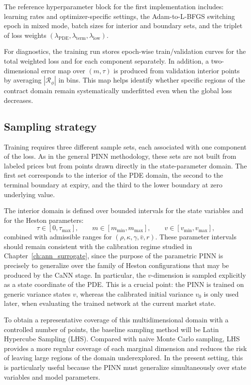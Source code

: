 The reference hyperparameter block for the first implementation includes: learning rates and optimizer-specific settings, the Adam-to-L-BFGS switching epoch in mixed mode, batch sizes for interior and boundary sets, and the triplet of loss weights $(\lambda_{\mathrm{PDE}},\lambda_{\mathrm{term}},\lambda_{\mathrm{low}})$.

For diagnostics, the training run stores epoch-wise train/validation curves for the total weighted loss and for each component separately. In addition, a two-dimensional error map over $(m,\tau)$ is produced from validation interior points by averaging $|\mathcal{R}_\phi|$ in bins. This map helps identify whether specific regions of the contract domain remain systematically underfitted even when the global loss decreases.

\subsection{Sampling strategy}

Training requires three different sample sets, each associated with one component of the loss. As in the general PINN methodology, these sets are not built from labeled prices but from points drawn directly in the state-parameter domain. The first set corresponds to the interior of the PDE domain, the second to the terminal boundary at expiry, and the third to the lower boundary at zero underlying value.

The interior domain is defined over bounded intervals for the state variables and for the Heston parameters:
\[
\tau \in [0,\tau_{\max}],\qquad
m \in [m_{\min},m_{\max}],\qquad
v \in [v_{\min},v_{\max}],
\]
combined with admissible ranges for $(\rho,\kappa,\gamma,\bar v,r)$. These parameter intervals should remain consistent with the calibration regime studied in Chapter~\ref{ch:ann_surrogate}, since the purpose of the parametric PINN is precisely to generalize over the family of Heston configurations that may be produced by the CaNN stage. In particular, the $v$-dimension is sampled explicitly as a state coordinate of the PDE. This is a crucial point: the PINN is trained on generic variance states $v$, whereas the calibrated initial variance $v_0$ is only used later, when evaluating the trained network at the current market state.

To obtain a representative coverage of this multidimensional domain with a controlled number of points, the baseline sampling method will be Latin Hypercube Sampling (LHS). Compared with naive Monte Carlo sampling, LHS provides a more regular coverage of each marginal dimension and reduces the risk of leaving large regions of the domain underexplored. In the present setting, this is particularly useful because the PINN must generalize simultaneously over state variables and model parameters.

